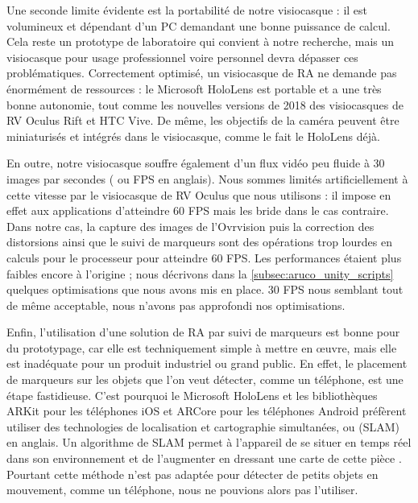 Une seconde limite évidente est la portabilité de notre visiocasque  : il est volumineux et dépendant d'un PC demandant une bonne puissance de calcul. Cela reste un prototype de laboratoire qui convient à notre recherche, mais un visiocasque pour usage professionnel voire personnel devra dépasser ces problématiques. Correctement optimisé, un visiocasque de RA ne demande pas énormément de ressources : le Microsoft HoloLens est portable et a une très bonne autonomie, tout comme les nouvelles versions de 2018 des visiocasques de RV Oculus Rift et HTC Vive. De même, les objectifs de la caméra peuvent être miniaturisés et intégrés dans le visiocasque, comme le fait le HoloLens déjà.


En outre, notre visiocasque souffre également d'un flux vidéo peu fluide à 30 images par secondes ( ou FPS en anglais). Nous sommes limités artificiellement à cette vitesse par le visiocasque de RV Oculus que nous utilisons : il impose en effet aux applications d'atteindre 60 FPS mais les bride dans le cas contraire. Dans notre cas, la capture des images de l'Ovrvision puis la correction des distorsions ainsi que le suivi de marqueurs sont des opérations trop lourdes en calculs pour le processeur pour atteindre 60 FPS. Les performances étaient plus faibles encore à l'origine ; nous décrivons dans la \autoref{subsec:aruco_unity_scripts} quelques optimisations que nous avons mis en place. 30 FPS nous semblant tout de même acceptable, nous n'avons pas approfondi nos optimisations.


Enfin, l'utilisation d'une solution de RA par suivi de marqueurs est bonne pour du prototypage, car elle est techniquement simple à mettre en \oe uvre, mais elle est inadéquate pour un produit industriel ou grand public. En effet, le placement de marqueurs sur les objets que l'on veut détecter, comme un téléphone, est une étape fastidieuse. C'est pourquoi le Microsoft HoloLens et les bibliothèques ARKit pour les téléphones iOS et ARCore pour les téléphones Android préfèrent utiliser des technologies de localisation et cartographie simultanées, ou  (SLAM) en anglais. Un algorithme de SLAM permet à l'appareil de se situer en temps réel dans son environnement et de l'augmenter en dressant une carte de cette pièce . Pourtant cette méthode n'est pas adaptée pour détecter de petits objets en mouvement, comme un téléphone, nous ne pouvions alors pas l'utiliser.


